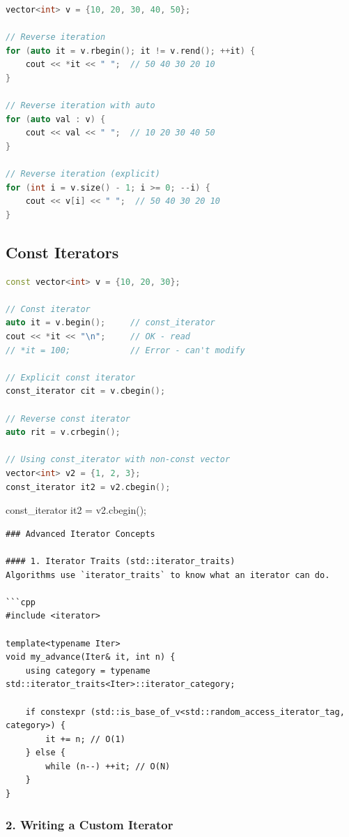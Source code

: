 \begin{lstlisting}[language={C++}]
vector<int> v = {10, 20, 30, 40, 50};

// Reverse iteration
for (auto it = v.rbegin(); it != v.rend(); ++it) {
    cout << *it << " ";  // 50 40 30 20 10
}

// Reverse iteration with auto
for (auto val : v) {
    cout << val << " ";  // 10 20 30 40 50
}

// Reverse iteration (explicit)
for (int i = v.size() - 1; i >= 0; --i) {
    cout << v[i] << " ";  // 50 40 30 20 10
}
\end{lstlisting}

\hypertarget{const-iterators}{%
\subsection{Const Iterators}\label{const-iterators}}

\begin{lstlisting}[language={C++}]
const vector<int> v = {10, 20, 30};

// Const iterator
auto it = v.begin();     // const_iterator
cout << *it << "\n";     // OK - read
// *it = 100;            // Error - can't modify

// Explicit const iterator
const_iterator cit = v.cbegin();

// Reverse const iterator
auto rit = v.crbegin();

// Using const_iterator with non-const vector
vector<int> v2 = {1, 2, 3};
const_iterator it2 = v2.cbegin();
\end{lstlisting}

const\_iterator it2 = v2.cbegin();

\begin{lstlisting}
### Advanced Iterator Concepts

#### 1. Iterator Traits (std::iterator_traits)
Algorithms use `iterator_traits` to know what an iterator can do.

```cpp
#include <iterator>

template<typename Iter>
void my_advance(Iter& it, int n) {
    using category = typename std::iterator_traits<Iter>::iterator_category;
    
    if constexpr (std::is_base_of_v<std::random_access_iterator_tag, category>) {
        it += n; // O(1)
    } else {
        while (n--) ++it; // O(N)
    }
}
\end{lstlisting}

\hypertarget{writing-a-custom-iterator}{%
\subsubsection{2. Writing a Custom
Iterator}\label{writing-a-custom-iterator}}

